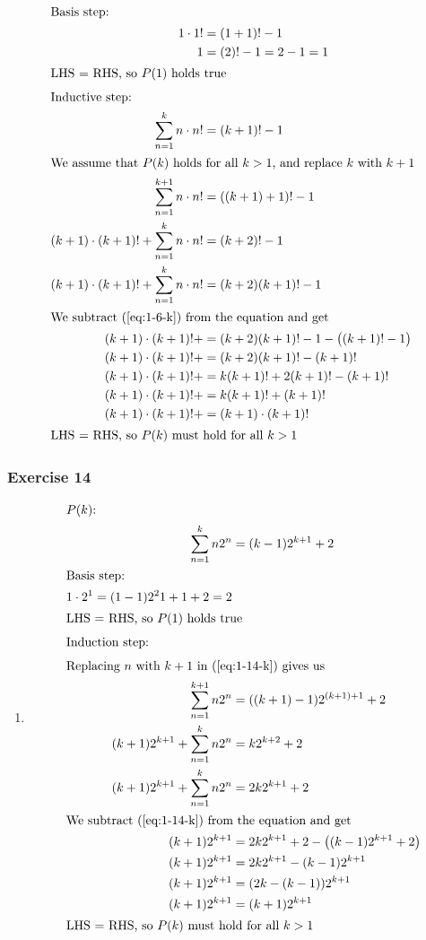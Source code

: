 \documentclass[a4paper]{article}
\newcommand{\ex}[1]{\subsubsection*{#1}}
\begin{document}
\begin{align}
    \intertext{Basis step:}
    1\cdot 1! &= (1 + 1)! - 1 \\
    1 &= (2)! - 1 = 2 - 1 = 1\\
    \intertext{LHS = RHS, so \(P(1)\) holds true}
    \intertext{Inductive step:}
    \sum_{n = 1}^k{n\cdot n!} &= (k + 1)! - 1 \label{eq:1-6-k}\\
    \intertext{We assume that \(P(k)\) holds for all \(k > 1\), and replace
        \(k\) with \(k+1\)}
    \sum_{n = 1}^{k+1}{n\cdot n!} &= ((k+1) + 1)! - 1 \\
    (k+1)\cdot(k+1)! + \sum_{n = 1}^{k}{n\cdot n!}  &= (k+2)! - 1 \\
    (k+1)\cdot(k+1)! + \sum_{n = 1}^{k}{n\cdot n!}  &= (k+2)(k+1)! - 1 \\
    \intertext{We subtract (\ref{eq:1-6-k}) from the equation and get}
    (k+1)\cdot(k+1)! +  &= (k+2)(k+1)! - 1 - \big( (k+1)! - 1\big)\\
    (k+1)\cdot(k+1)! +  &= (k+2)(k+1)!  -  (k+1)! \\
    (k+1)\cdot(k+1)! +  &= k(k+1)! + 2(k+1)! - (k+1)! \\
    (k+1)\cdot(k+1)! +  &= k(k+1)! + (k+1)!  \\
    (k+1)\cdot(k+1)! +  &= (k+1)\cdot(k+1)!  \\
    \intertext{LHS = RHS, so \(P(k)\) must hold for all \(k > 1\)}
\end{align}


\newpage
\ex{Exercise 14} 

\begin{enumerate}[label=\alph*)] 
    \item 
        \begin{align}
            \intertext{\(P(k)\):}
            \sum_{n=1}^k{ n2^n} &= (k-1)2^{k+1} + 2 \label{eq:1-14-k}\\
            \intertext{Basis step:}
            1\cdot 2^1 = (1-1)2^2{1+1} + 2 = 2\\
            \intertext{LHS = RHS, so \(P(1)\) holds true}
            \intertext{Induction step:}
            \intertext{Replacing \(n\) with \(k+1\) in (\ref{eq:1-14-k}) gives us}
            \sum_{n=1}^{k+1}{ n2^n} &= ((k+1)-1)2^{(k+1)+1} + 2 \\
            (k+1)2^{k+1} + \sum_{n=1}^{k}{ n2^n} &= k2^{k+2} + 2 \\
            (k+1)2^{k+1} + \sum_{n=1}^{k}{ n2^n} &= 2k2^{k+1} + 2 \\
            \intertext{We subtract (\ref{eq:1-14-k}) from the equation and get}
            (k+1)2^{k+1} &= 2k2^{k+1} + 2 - \big((k-1)2^{k+1} + 2\big) \\
            (k+1)2^{k+1} &= 2k2^{k+1} - (k-1)2^{k+1} \\
            (k+1)2^{k+1} &= (2k - (k-1)) 2^{k+1}\\
            (k+1)2^{k+1} &= (k+1)2^{k+1}\\
            \intertext{LHS = RHS, so \(P(k)\) must hold for all \(k > 1\)}
        \end{align}
\end{enumerate}
\end{document}
